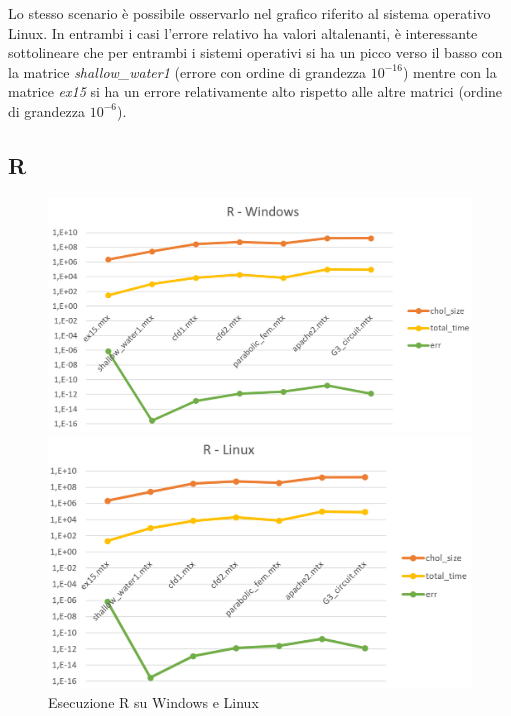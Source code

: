 \documentclass[a4paper,12pt]{article}
\begin{document}
\noindent Lo stesso scenario è possibile osservarlo nel grafico riferito al sistema operativo Linux.
In entrambi i casi l’errore relativo ha valori altalenanti, è interessante sottolineare che per entrambi i sistemi operativi si ha un picco verso il basso con la matrice \textit{shallow\_water1} (errore con ordine di grandezza $10^{-16}$) mentre con la matrice \textit{ex15} si ha un errore relativamente alto rispetto alle altre matrici (ordine di grandezza $10^{-6}$).

\subsection{R}


\begin{figure}[H]
\centering
\begin{minipage}{.5\textwidth}
  \centering
  \includegraphics[width=1\linewidth]{img/Rwin.png}
\end{minipage}%
\begin{minipage}{.5\textwidth}
  \centering
  \includegraphics[width=1\linewidth]{img/Rlinux.png}
\end{minipage}
\caption{Esecuzione R su Windows e Linux}
\end{figure}
\end{document}
